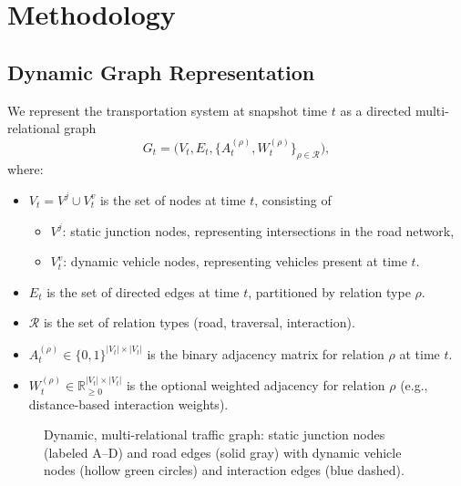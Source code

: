 \section{Methodology}

\subsection{Dynamic Graph Representation}
We represent the transportation system at snapshot time $t$ as a directed multi-relational graph
\[
G_t = \big(V_t, E_t, \{A_t^{(\rho)}, W_t^{(\rho)}\}_{\rho\in\mathcal{R}}\big),
\]
where:
\begin{itemize}
    \item $V_t = V^j \cup V_t^v$ is the set of nodes at time $t$, consisting of
        \begin{itemize}
            \item $V^j$: static junction nodes, representing intersections in the road network,
            \item $V_t^v$: dynamic vehicle nodes, representing vehicles present at time $t$.
        \end{itemize}
    \item $E_t$ is the set of directed edges at time $t$, partitioned by relation type $\rho$.
    \item $\mathcal{R}$ is the set of relation types (road, traversal, interaction).
    \item $A_t^{(\rho)} \in \{0,1\}^{|V_t|\times |V_t|}$ is the binary adjacency matrix for relation $\rho$ at time $t$.
    \item $W_t^{(\rho)} \in \mathbb{R}_{\ge 0}^{|V_t|\times |V_t|}$ is the optional weighted adjacency for relation $\rho$ (e.g., distance-based interaction weights).
\end{itemize}

\begin{figure}[t]
    \centering
    \caption{Dynamic, multi-relational traffic graph: static junction nodes (labeled A--D) and road edges (solid gray) with dynamic vehicle nodes (hollow green circles) and interaction edges (blue dashed).}
    \label{fig:dyn-graph}
\end{figure}


